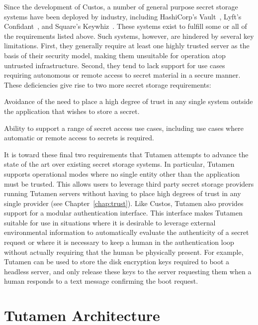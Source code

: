 Since the development of Custos, a number of general purpose secret
storage systems have been deployed by industry, including HashiCorp's
Vault~\cite{vault}, Lyft's Confidant~\cite{confidant}, and Square's
Keywhiz~\cite{keywhiz}. These systems exist to fulfill some or all of
the requirements listed above. Such systems, however, are hindered by
several key limitations. First, they generally require at least one
highly trusted server as the basis of their security model, making
them unsuitable for operation atop untrusted infrastructure. Second,
they tend to lack support for use cases requiring autonomous or remote
access to secret material in a secure manner. These deficiencies give
rise to two more secret storage requirements:

\begin{packed_item}
\item Avoidance of the need to place a high degree of trust in any
  single system outside the application that wishes to store a secret.
\item Ability to support a range of secret access use cases, including
  use cases where automatic or remote access to secrets is required.
\end{packed_item}

It is toward these final two requirements that Tutamen attempts to
advance the state of the art over existing secret storage systems. In
particular, Tutamen supports operational modes where no single entity
other than the application must be trusted. This allows users to
leverage third party secret storage providers running Tutamen servers
without having to place high degrees of trust in any single provider
(see Chapter~\ref{chap:trust}). Like Custos, Tutamen also provides
support for a modular authentication interface. This interface makes
Tutamen suitable for use in situations where it is desirable to
leverage external environmental information to automatically evaluate
the authenticity of a secret request or where it is necessary to keep
a human in the authentication loop without actually requiring that the
human be physically present. For example, Tutamen can be used to store
the disk encryption keys required to boot a headless server, and only
release these keys to the server requesting them when a human responds
to a text message confirming the boot request.

\section{Tutamen Architecture}
\label{chap:tutamen:arch}

